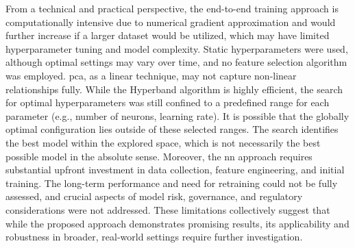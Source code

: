 From a technical and practical perspective, the end-to-end training approach is computationally intensive due to numerical gradient approximation and would further increase if a larger dataset would be utilized, which may have limited hyperparameter tuning and model complexity. Static hyperparameters were used, although optimal settings may vary over time, and no feature selection algorithm was employed. \ac{pca}, as a linear technique, may not capture non-linear relationships fully. While the Hyperband algorithm is highly efficient, the search for optimal hyperparameters was still confined to a predefined range for each parameter (e.g., number of neurons, learning rate). It is possible that the globally optimal configuration lies outside of these selected ranges. The search identifies the best model within the explored space, which is not necessarily the best possible model in the absolute sense. Moreover, the \ac{nn} approach requires substantial upfront investment in data collection, feature engineering, and initial training. The long-term performance and need for retraining could not be fully assessed, and crucial aspects of model risk, governance, and regulatory considerations were not addressed. These limitations collectively suggest that while the proposed approach demonstrates promising results, its applicability and robustness in broader, real-world settings require further investigation.